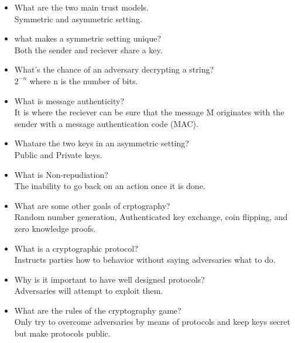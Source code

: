 \begin{itemize}
    \item What are the two main trust models.\\
          Symmetric and asymmetric setting.\\

    \item what makes a symmetric setting unique?\\
          Both the sender and reciever share a key.\\

    \item What's the chance of an adversary decrypting a string?\\
          $2^{-n}$ where n is the number of bits.\\

    \item What is message authenticity?\\
          It is where the reciever can be sure that the message M originates with the sender with a message authentication code (MAC).\\

    \item Whatare the two keys in an asymmetric setting?\\
          Public and Private keys.\\

    \item What is Non-repudiation?\\
          The inability to go back on an action once it is done.\\

    \item What are some other goals of crptography?\\
          Random number generation, Authenticated key exchange, coin flipping, and zero knowledge proofs.\\

    \item What is a cryptographic protocol?\\
          Instructs parties how to behavior without saying adversaries what to do.

    \item Why is it important to have well designed protocols?\\
          Adversaries will attempt to exploit them.\\

    \item What are the rules of the cryptography game?\\
          Only try to overcome adversaries by means of protocols and keep keys secret but make protocols public.\\


\end{itemize}
